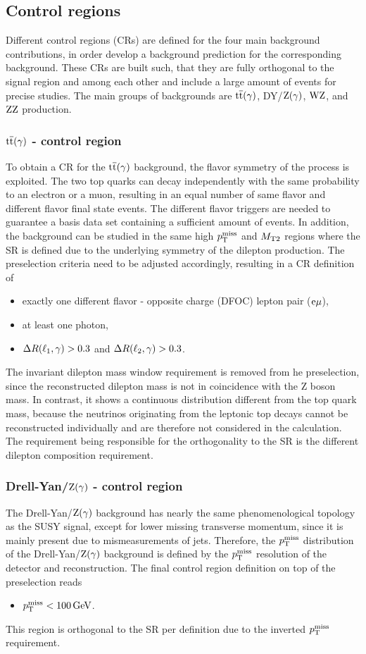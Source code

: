 \subsection{Control regions}\label{sec:CR}
Different control regions (CRs) are defined for the four main background contributions, in order develop a background prediction for the corresponding background. These CRs are built such, that they are fully orthogonal to the signal region and among each other and include a large amount of events for precise studies. The main groups of backgrounds are ${\mathrm{t}\overline{\mathrm{t}}}(\gamma)$, DY/$\mathrm{Z}(\gamma)$, $\mathrm{W}\mathrm{Z}$, and $\mathrm{Z}\mathrm{Z}$ production.

\subsubsection*{${\mathrm{t}\overline{\mathrm{t}}}(\gamma)$ - control region}
To obtain a CR for the ${\mathrm{t}\overline{\mathrm{t}}}(\gamma)$ background, the flavor symmetry of the process is exploited. The two top quarks can decay independently with the same probability to an electron or a muon, resulting in an equal number of same flavor and different flavor final state events. The different flavor triggers are needed to guarantee a basis data set containing a sufficient amount of events. In addition, the background can be studied in the same high $p_{\mathrm{T}}^\text{miss}$ and $M_{\mathrm{T2}}$ regions where the SR is defined due to the underlying symmetry of the dilepton production. The preselection criteria need to be adjusted accordingly, resulting in a CR definition of
\begin{itemize}
 \item exactly one different flavor - opposite charge (DFOC) lepton pair ($\mathrm{e}{\mu}$),
 \item at least one photon,
 \item $\Delta R(\ell_1,\gamma)>0.3$ and $\Delta R(\ell_2,\gamma)>0.3$.
\end{itemize}
The invariant dilepton mass window requirement is removed from he preselection, since the reconstructed dilepton mass is not in coincidence with the Z boson mass. In contrast, it shows a continuous distribution different from the top quark mass, because the neutrinos originating from the leptonic top decays cannot be reconstructed individually and are therefore not considered in the calculation. The requirement being responsible for the orthogonality to the SR is the different dilepton composition requirement.
\subsubsection*{Drell-Yan/$\mathrm{Z}(\gamma)$ - control region}
The Drell-Yan/$\mathrm{Z}(\gamma)$ background has nearly the same phenomenological topology as the SUSY signal, except for lower missing transverse momentum, since it is mainly present due to mismeasurements of jets. Therefore, the $p_{\mathrm{T}}^\text{miss}$ distribution of the Drell-Yan/$\mathrm{Z}(\gamma)$ background is defined by the $p_{\mathrm{T}}^\text{miss}$ resolution of the detector and reconstruction. The final control region definition on top of the preselection reads
\begin{itemize}
 \item $p_{\mathrm{T}}^\text{miss}<100\,\text{Ge\hspace{-.08em}V}$.
\end{itemize}
This region is orthogonal to the SR per definition due to the inverted $p_{\mathrm{T}}^\text{miss}$ requirement.
